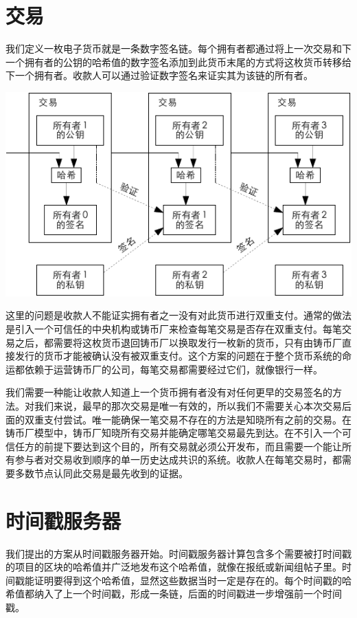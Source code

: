 \documentclass{article}
\begin{document}
\section{交易}
我们定义一枚电子货币就是一条数字签名链。每个拥有者都通过将上一次交易和下一个拥有者的公钥的哈希值的数字签名添加到此货币末尾的方式将这枚货币转移给下一个拥有者。收款人可以通过验证数字签名来证实其为该链的所有者。

\begin{center}
 \includegraphics{bitcoin-zh-cn-1}
\end{center}

这里的问题是收款人不能证实拥有者之一没有对此货币进行双重支付。通常的做法是引入一个可信任的中央机构或铸币厂来检查每笔交易是否存在双重支付。每笔交易之后，都需要将这枚货币退回铸币厂以换取发行一枚新的货币，只有由铸币厂直接发行的货币才能被确认没有被双重支付。这个方案的问题在于整个货币系统的命运都依赖于运营铸币厂的公司，每笔交易都需要经过它们，就像银行一样。

我们需要一种能让收款人知道上一个货币拥有者没有对任何更早的交易签名的方法。对我们来说，最早的那次交易是唯一有效的，所以我们不需要关心本次交易后面的双重支付尝试。唯一能确保一笔交易不存在的方法是知晓所有之前的交易。在铸币厂模型中，铸币厂知晓所有交易并能确定哪笔交易最先到达。在不引入一个可信任方的前提下要达到这个目的，所有交易就必须公开发布\cite{Dai}，而且需要一个能让所有参与者对交易收到顺序的单一历史达成共识的系统。收款人在每笔交易时，都需要多数节点认同此交易是最先收到的证据。

\section{时间戳服务器}
我们提出的方案从时间戳服务器开始。时间戳服务器计算包含多个需要被打时间戳的项目的区块的哈希值并广泛地发布这个哈希值，就像在报纸或新闻组帖子里\cite{Massias,Haber,Bayer,Stornetta}。时间戳能证明要得到这个哈希值，显然这些数据当时一定是存在的。每个时间戳的哈希值都纳入了上一个时间戳，形成一条链，后面的时间戳进一步增强前一个时间戳。
\end{document}
